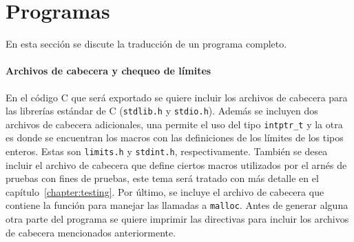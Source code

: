 \begin{comment}
                                                                                                               & \verb|=================| \\
                                                                                                               & \verb|1: <free>| \\
                                                                                                               & \verb|2: [44, *2[0]]| \\
                                                                                                               & \verb|3: [78]| \\
  \hline
\end{tabular}

\caption{Ejemplo de \textit{pretty printing} para un estado}
\label{tab:pretty_simp_state}
\end{table}
\end{comment}


\section{Programas}

En esta sección se discute la traducción de un programa completo.

\paragraph*{Archivos de cabecera y chequeo de límites}

En el código C que será exportado se quiere incluir los archivos de cabecera para las librerías estándar de C (\verb|stdlib.h| y \verb|stdio.h|).
Además se incluyen dos archivos de cabecera adicionales, una permite el uso del tipo \verb|intptr_t| y la otra es donde se encuentran los macros con las definiciones de los límites de los tipos enteros.
Estas son \verb|limits.h| y \verb|stdint.h|, respectivamente.
También se desea incluir el archivo de cabecera que define ciertos macros utilizados por el arnés de pruebas con fines de pruebas, este tema será tratado con más detalle en el capítulo~\ref{chapter:testing}.
Por último, se incluye el archivo de cabecera que contiene la función para manejar las llamadas a \verb|malloc|.
Antes de generar alguna otra parte del programa se quiere imprimir las directivas para incluir los archivos de cabecera mencionados anteriormente.


